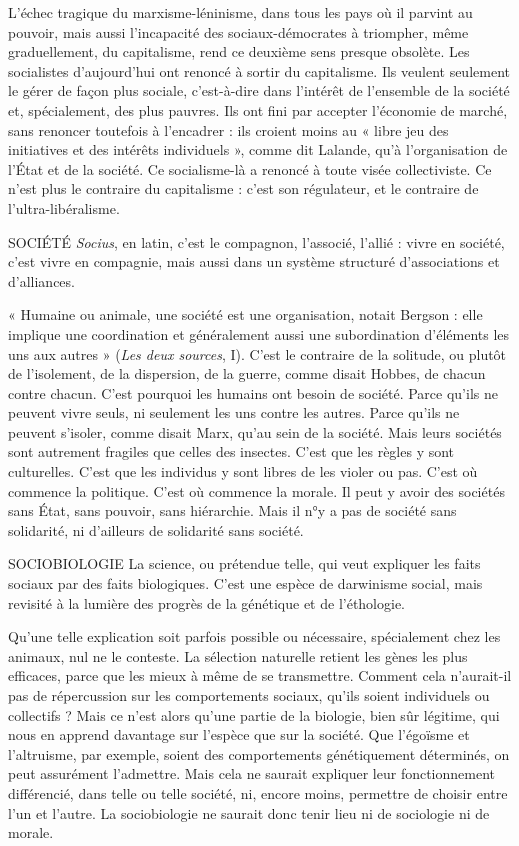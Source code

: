 L’échec tragique du marxisme-léninisme, dans tous les pays où il parvint au
pouvoir, mais aussi l’incapacité des sociaux-démocrates à triompher, même graduellement,
du capitalisme, rend ce deuxième sens presque obsolète. Les socialistes
d’aujourd’hui ont renoncé à sortir du capitalisme. Ils veulent seulement le
gérer de façon plus sociale, c’est-à-dire dans l’intérêt de l’ensemble de la société
et, spécialement, des plus pauvres. Ils ont fini par accepter l’économie de
marché, sans renoncer toutefois à l’encadrer : ils croient moins au « libre jeu des
initiatives et des intérêts individuels », comme dit Lalande, qu’à l’organisation
de l’État et de la société. Ce socialisme-là a renoncé à toute visée collectiviste.
Ce n’est plus le contraire du capitalisme : c’est son régulateur, et le contraire de
l'ultra-libéralisme.

SOCIÉTÉ  {\it Socius}, en latin, c’est le compagnon, l'associé, l’allié : vivre en
société, c’est vivre en compagnie, mais aussi dans un système
structuré d'associations et d’alliances.

« Humaine ou animale, une société est une organisation, notait Bergson :
elle implique une coordination et généralement aussi une subordination d’éléments
les uns aux autres » ({\it Les deux sources}, I). C’est le contraire de la solitude,
ou plutôt de l'isolement, de la dispersion, de la guerre, comme disait
Hobbes, de chacun contre chacun. C’est pourquoi les humains ont besoin de
société. Parce qu’ils ne peuvent vivre seuls, ni seulement les uns contre les
autres. Parce qu’ils ne peuvent s’isoler, comme disait Marx, qu’au sein de la
société. Mais leurs sociétés sont autrement fragiles que celles des insectes. C’est
que les règles y sont culturelles. C’est que les individus y sont libres de les violer
ou pas. C'est où commence la politique. C’est où commence la morale. Il peut
y avoir des sociétés sans État, sans pouvoir, sans hiérarchie. Mais il n°y a pas de
société sans solidarité, ni d’ailleurs de solidarité sans société.

SOCIOBIOLOGIE La science, ou prétendue telle, qui veut expliquer les
faits sociaux par des faits biologiques. C’est une espèce
de darwinisme social, mais revisité à la lumière des progrès de la génétique et
de l’éthologie.

Qu’une telle explication soit parfois possible ou nécessaire, spécialement
chez les animaux, nul ne le conteste. La sélection naturelle retient les gènes les
plus efficaces, parce que les mieux à même de se transmettre. Comment cela
n'aurait-il pas de répercussion sur les comportements sociaux, qu’ils soient
individuels ou collectifs ? Mais ce n’est alors qu'une partie de la biologie, bien
sûr légitime, qui nous en apprend davantage sur l’espèce que sur la société. Que
l’égoïsme et l’altruisme, par exemple, soient des comportements génétiquement
déterminés, on peut assurément l’admettre. Mais cela ne saurait expliquer leur
fonctionnement différencié, dans telle ou telle société, ni, encore moins, permettre
de choisir entre l’un et l’autre. La sociobiologie ne saurait donc tenir
lieu ni de sociologie ni de morale.

